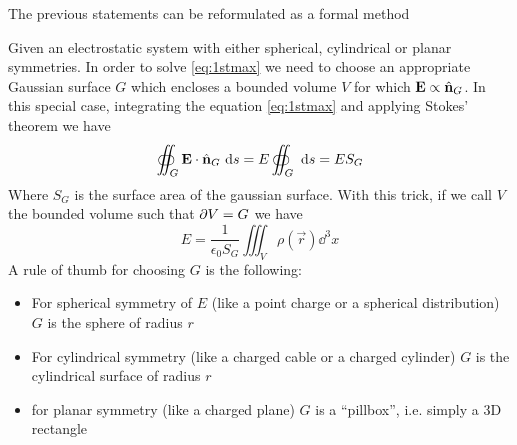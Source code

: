 \documentclass[../electromagnetism]{subfiles}
\begin{document}
The previous statements can be reformulated as a formal method
\begin{mtd}
	Given an electrostatic system with either spherical, cylindrical or planar symmetries. In order to solve \eqref{eq:1stmax} we need to choose an appropriate Gaussian surface $G$ which encloses a bounded volume $V$ for which $\mathbf{E}\propto\hat{\mathbf{n}}_G$. In this special case, integrating the equation \eqref{eq:1stmax} and applying Stokes' theorem we have
	\begin{equation}
		\oiint_G\mathbf{E}\cdot\hat{\mathbf{n}}_G\ \mathrm{d} s=E\oiint_G\ \mathrm{d} s=ES_G
		\label{eq:gausssurftrick}
	\end{equation}
	Where $S_G$ is the surface area of the gaussian surface. With this trick, if we call $V$ the bounded volume such that $\partial V=G$ we have
	\begin{equation*}
		E=\frac{1}{\epsilon_0 S_G}\iiint_V\rho(\vec{r})\dd^3x
	\end{equation*}
	A rule of thumb for choosing $G$ is the following:
	\begin{itemize}
	\item For spherical symmetry of $E$ (like a point charge or a spherical distribution) $G$ is the sphere of radius $r$
	\item For cylindrical symmetry (like a charged cable or a charged cylinder) $G$ is the cylindrical surface of radius $r$
	\item for planar symmetry (like a charged plane) $G$ is a ``pillbox'', i.e. simply a 3D rectangle
	\end{itemize}
\end{mtd}
\end{document}
